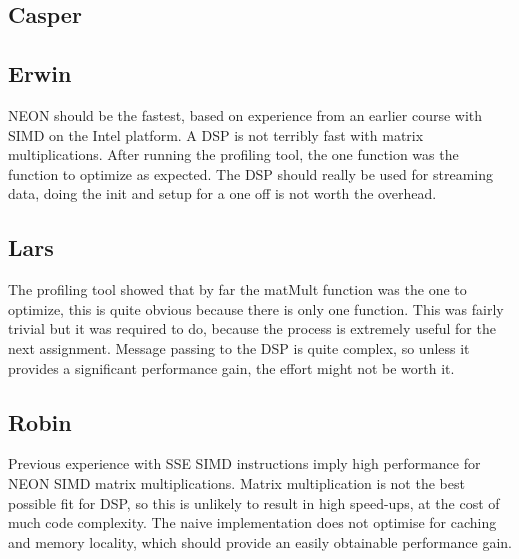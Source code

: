 \documentclass[final]{article} %
\begin{document}
\begin{appendices}
\subsection{Casper}

\subsection{Erwin}
NEON should be the fastest, based on experience from an earlier course with SIMD on the Intel platform.
A DSP is not terribly fast with matrix multiplications.
After running the profiling tool, the one function was the function to optimize as expected.
The DSP should really be used for streaming data, doing the init and setup for a one off is not worth the overhead.

\subsection{Lars}
The profiling tool showed that by far the matMult function was the one to optimize, this is quite obvious because there is only one function.
This was fairly trivial but it was required to do, because the process is extremely useful for the next assignment. Message passing to the DSP is quite complex, so unless it provides a significant performance gain, the effort might not be worth it.

\subsection{Robin}
Previous experience with SSE SIMD instructions imply high performance for NEON SIMD matrix multiplications. Matrix multiplication is not the best possible fit for DSP, so this is unlikely to result in high speed-ups, at the cost of much code complexity. The naive implementation does not optimise for caching and memory locality, which should provide an easily obtainable performance gain.

\end{appendices}
\end{document}

